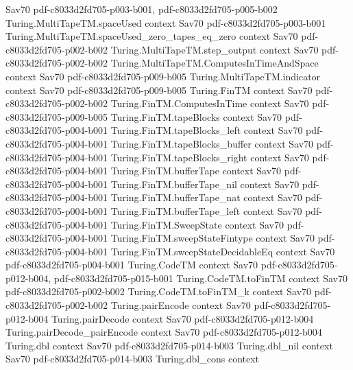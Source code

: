 \begin{theorem}
  {Sav70}
  {pdf-c8033d2fd705-p003-b001,
    pdf-c8033d2fd705-p005-b002}
\proofstep
  {Turing.MultiTapeTM.spaceUsed}
  {context}
  {Sav70}
  {pdf-c8033d2fd705-p003-b001}
\proofstep
  {Turing.MultiTapeTM.spaceUsed_zero_tapes_eq_zero}
  {context}
  {Sav70}
  {pdf-c8033d2fd705-p002-b002}
\proofstep
  {Turing.MultiTapeTM.step_output}
  {context}
  {Sav70}
  {pdf-c8033d2fd705-p002-b002}
\proofstep
  {Turing.MultiTapeTM.ComputesInTimeAndSpace}
  {context}
  {Sav70}
  {pdf-c8033d2fd705-p009-b005}
\proofstep
  {Turing.MultiTapeTM.indicator}
  {context}
  {Sav70}
  {pdf-c8033d2fd705-p009-b005}
\proofstep
  {Turing.FinTM}
  {context}
  {Sav70}
  {pdf-c8033d2fd705-p002-b002}
\proofstep
  {Turing.FinTM.ComputesInTime}
  {context}
  {Sav70}
  {pdf-c8033d2fd705-p009-b005}
\proofstep
  {Turing.FinTM.tapeBlocks}
  {context}
  {Sav70}
  {pdf-c8033d2fd705-p004-b001}
\proofstep
  {Turing.FinTM.tapeBlocks_left}
  {context}
  {Sav70}
  {pdf-c8033d2fd705-p004-b001}
\proofstep
  {Turing.FinTM.tapeBlocks_buffer}
  {context}
  {Sav70}
  {pdf-c8033d2fd705-p004-b001}
\proofstep
  {Turing.FinTM.tapeBlocks_right}
  {context}
  {Sav70}
  {pdf-c8033d2fd705-p004-b001}
\proofstep
  {Turing.FinTM.bufferTape}
  {context}
  {Sav70}
  {pdf-c8033d2fd705-p004-b001}
\proofstep
  {Turing.FinTM.bufferTape_nil}
  {context}
  {Sav70}
  {pdf-c8033d2fd705-p004-b001}
\proofstep
  {Turing.FinTM.bufferTape_nat}
  {context}
  {Sav70}
  {pdf-c8033d2fd705-p004-b001}
\proofstep
  {Turing.FinTM.bufferTape_left}
  {context}
  {Sav70}
  {pdf-c8033d2fd705-p004-b001}
\proofstep
  {Turing.FinTM.SweepState}
  {context}
  {Sav70}
  {pdf-c8033d2fd705-p004-b001}
\proofstep
  {Turing.FinTM.sweepStateFintype}
  {context}
  {Sav70}
  {pdf-c8033d2fd705-p004-b001}
\proofstep
  {Turing.FinTM.sweepStateDecidableEq}
  {context}
  {Sav70}
  {pdf-c8033d2fd705-p004-b001}
\proofstep
  {Turing.CodeTM}
  {context}
  {Sav70}
  {pdf-c8033d2fd705-p012-b004,
    pdf-c8033d2fd705-p015-b001}
\proofstep
  {Turing.CodeTM.toFinTM}
  {context}
  {Sav70}
  {pdf-c8033d2fd705-p002-b002}
\proofstep
  {Turing.CodeTM.toFinTM_k}
  {context}
  {Sav70}
  {pdf-c8033d2fd705-p002-b002}
\proofstep
  {Turing.pairEncode}
  {context}
  {Sav70}
  {pdf-c8033d2fd705-p012-b004}
\proofstep
  {Turing.pairDecode}
  {context}
  {Sav70}
  {pdf-c8033d2fd705-p012-b004}
\proofstep
  {Turing.pairDecode_pairEncode}
  {context}
  {Sav70}
  {pdf-c8033d2fd705-p012-b004}
\proofstep
  {Turing.dbl}
  {context}
  {Sav70}
  {pdf-c8033d2fd705-p014-b003}
\proofstep
  {Turing.dbl_nil}
  {context}
  {Sav70}
  {pdf-c8033d2fd705-p014-b003}
\proofstep
  {Turing.dbl_cons}
  {context}

\end{theorem}

